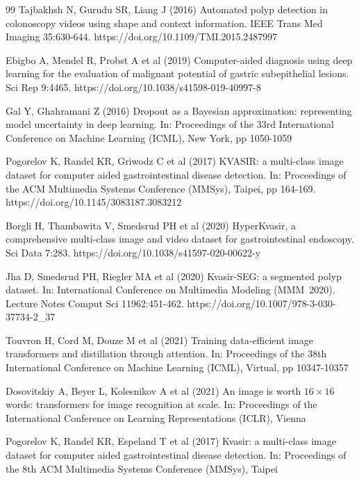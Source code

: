 \documentclass[11pt,a4paper]{article}
\begin{document}
\begin{thebibliography}{99}
Tajbakhsh N, Gurudu SR, Liang J (2016) Automated polyp detection in
  colonoscopy videos using shape and context information. IEEE Trans Med
  Imaging 35:630-644.
  https://doi.org/10.1109/TMI.2015.2487997

Ebigbo A, Mendel R, Probst A et al (2019) Computer-aided diagnosis using
  deep learning for the evaluation of malignant potential of gastric
  subepithelial lesions. Sci Rep 9:4465.
  https://doi.org/10.1038/s41598-019-40997-8

Gal Y, Ghahramani Z (2016) Dropout as a {Bayesian} approximation:
  representing model uncertainty in deep learning. In: Proceedings of the
  33rd International Conference on Machine Learning (ICML), New York,
  pp 1050-1059

Pogorelov K, Randel KR, Griwodz C et al (2017) {KVASIR}: a multi-class
  image dataset for computer aided gastrointestinal disease detection.
  In: Proceedings of the ACM Multimedia Systems Conference (MMSys),
  Taipei, pp 164-169. https://doi.org/10.1145/3083187.3083212

Borgli H, Thambawita V, Smedsrud PH et al (2020) {HyperKvasir}, a
  comprehensive multi-class image and video dataset for gastrointestinal
  endoscopy. Sci Data 7:283.
  https://doi.org/10.1038/s41597-020-00622-y

Jha D, Smedsrud PH, Riegler MA et al (2020) Kvasir-SEG: a segmented
  polyp dataset. In: International Conference on Multimedia Modeling
  (MMM~2020). Lecture Notes Comput Sci 11962:451-462.
  https://doi.org/10.1007/978-3-030-37734-2\_37

Touvron H, Cord M, Douze M et al (2021) Training data-efficient image
  transformers and distillation through attention. In: Proceedings of the
  38th International Conference on Machine Learning (ICML), Virtual,
  pp 10347-10357

Dosovitskiy A, Beyer L, Kolesnikov A et al (2021) An image is worth
  $16\times16$ words: transformers for image recognition at scale.
  In: Proceedings of the International Conference on Learning
  Representations (ICLR), Vienna

Pogorelov K, Randel KR, Espeland T et al (2017) Kvasir: a multi-class
  image dataset for computer aided gastrointestinal disease detection.
  In: Proceedings of the 8th ACM Multimedia Systems Conference (MMSys),
  Taipei


\end{thebibliography}
\end{document}
